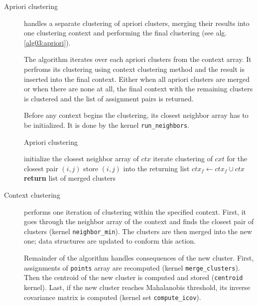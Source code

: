\begin{description}
	\item[Apriori clustering] handles a separate clustering of apriori clusters, merging their results into one clustering context and performing the final clustering (see alg. \ref{alg03:apriori}).
	
	The algorithm iterates over each apriori clusters from the context array. It perfroms its clustering using context clustering method and the result is inserted into the final context. Either when all apriori clusters are merged or when there are none at all, the final context with the remaining clusters is clustered and the list of assignment pairs is returned.
	
	Before any context begins the clustering, its closest neighbor array has to be initialized. It is done by the kernel \texttt{run\_neighbors}.
	
	
	\begin{algorithm}
		\caption{Apriori clustering}
		\label{alg03:apriori}
		\begin{algorithmic}[1]
			 
			\State initialize the closest neighbor array of $ctx$ 
			\State iterate clustering of $cxt$ for the closest pair $(i,j)$  
			\State store $(i,j)$ into the returning list
			\EndWhile
			\State $ctx_f \gets ctx_f \cup ctx$ 
			\EndFor
			\State \textbf{return} list of merged clusters
			\EndProcedure
		\end{algorithmic}
	\end{algorithm}

	\item[Context clustering] performs one iteration of clustering within the specified context. First, it goes through the neighbor array of the context and finds the closest pair of clusters (kernel \texttt{neighbor\_min}). The clusters are then merged into the new one; data structures are updated to conform this action. 
	
	Remainder of the algorithm handles consequences of the new cluster. First, assignments of \texttt{points} array are recomputed (kernel \texttt{merge\_clusters}). Then the centroid of the new cluster is computed and stored (\texttt{centroid} kernel). Last, if the new cluster reaches Mahalanobis threshold, its inverse covariance matrix is computed (kernel set \texttt{compute\_icov}). 
	

\end{description}

